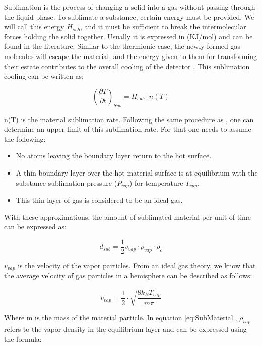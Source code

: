 Sublimation is the process of changing a solid into a gas without passing through the liquid phase. To sublimate a substance, certain energy must be provided. We will call this energy $H_{sub}$, and it must be sufficient to break the intermolecular forces holding the solid together. Usually it is expressed in (KJ/mol) and can be found in the literature. Similar to the thermionic case, the newly formed gas molecules will escape the material, and the energy given to them for transforming their estate contributes to the overall cooling of the detector \parencite[][]{ref:SublimationCooling}. This sublimation cooling can be written as: 

\begin{equation}
    \left(\frac{\partial T}{\partial t}\right)_{Sub} = H_{sub}\cdot n(T)
\end{equation}

n(T) is the material sublimation rate. Following the same procedure as \parencite[][]{ref:SubRate}, one can determine an upper limit of this sublimation rate. For that one needs to assume the following: 

\begin{itemize}
    \item No atoms leaving the boundary layer return to the hot surface. 
    \item A thin boundary layer over the hot material surface is at equilibrium with the substance sublimation pressure ($P_{vap}$) for temperature $T_{vap}$. 
    \item This thin layer of gas is considered to be an ideal gas. 
\end{itemize}

With these approximations, the amount of sublimated material per unit of time can be expressed as: 

\begin{equation}
    d_{sub} = \frac{1}{2}v_{vap}\cdot \rho_{vap} \cdot \rho_{c}
    \label{eq:SubMaterial}
\end{equation}

$v_{vap}$ is the velocity of the vapor particles. From an ideal gas theory, we know that the average velocity of gas particles in a hemisphere can be described as follows: 

\begin{equation}
    v_{vap} = \frac{1}{2}\cdot \sqrt{\frac{8k_B T_{vap}}{m \pi}}
\end{equation}

Where m is the mass of the material particle. In equation \ref{eq:SubMaterial}, $\rho_{vap}$ refers to the vapor density in the equilibrium layer and can be expressed using the formula: 

